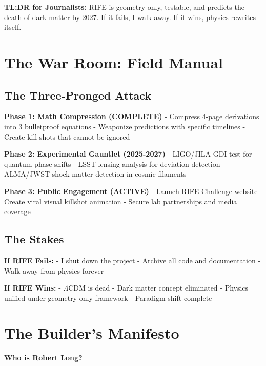 \documentclass[11pt]{report}
\newcommand{\lamcdm}{$\Lambda$CDM}
\begin{document}
\textbf{TL;DR for Journalists:} RIFE is geometry-only, testable, and predicts the death of dark matter by 2027. If it fails, I walk away. If it wins, physics rewrites itself.

\section*{The War Room: Field Manual}

\subsection*{The Three-Pronged Attack}

\textbf{Phase 1: Math Compression (COMPLETE)}
- Compress 4-page derivations into 3 bulletproof equations
- Weaponize predictions with specific timelines
- Create kill shots that cannot be ignored

\textbf{Phase 2: Experimental Gauntlet (2025-2027)}
- LIGO/JILA GDI test for quantum phase shifts
- LSST lensing analysis for deviation detection
- ALMA/JWST shock matter detection in cosmic filaments

\textbf{Phase 3: Public Engagement (ACTIVE)}
- Launch RIFE Challenge website
- Create viral visual killshot animation
- Secure lab partnerships and media coverage

\subsection*{The Stakes}

\textbf{If RIFE Fails:}
- I shut down the project
- Archive all code and documentation
- Walk away from physics forever

\textbf{If RIFE Wins:}
- \lamcdm{} is dead
- Dark matter concept eliminated
- Physics unified under geometry-only framework
- Paradigm shift complete

\section*{The Builder's Manifesto}

\textbf{Who is Robert Long?}
\end{document}
